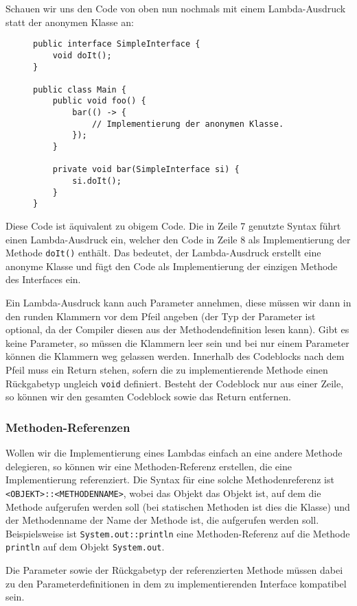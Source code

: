 	Schauen wir uns den Code von oben nun nochmals mit einem Lambda-Ausdruck statt der anonymen Klasse an:
	\begin{figure}[H]
		\centering
		\begin{lstlisting}
public interface SimpleInterface {
	void doIt();
}

public class Main {
	public void foo() {
		bar(() -> {
			// Implementierung der anonymen Klasse.
		});
	}

	private void bar(SimpleInterface si) {
		si.doIt();
	}
}
\end{lstlisting}
	\end{figure}
	Diese Code ist äquivalent zu obigem Code. Die in Zeile 7 genutzte Syntax führt einen Lambda-Ausdruck ein, welcher den Code in Zeile 8 als Implementierung der Methode \lstinline|doIt()| enthält. Das bedeutet, der Lambda-Ausdruck erstellt eine anonyme Klasse und fügt den Code als Implementierung der einzigen Methode des Interfaces ein.
	
	Ein Lambda-Ausdruck kann auch Parameter annehmen, diese müssen wir dann in den runden Klammern vor dem Pfeil angeben (der Typ der Parameter ist optional, da der Compiler diesen aus der Methodendefinition lesen kann). Gibt es keine Parameter, so müssen die Klammern leer sein und bei nur einem Parameter können die Klammern weg gelassen werden. Innerhalb des Codeblocks nach dem Pfeil muss ein Return stehen, sofern die zu implementierende Methode einen Rückgabetyp ungleich \lstinline|void| definiert. Besteht der Codeblock nur aus einer Zeile, so können wir den gesamten Codeblock sowie das Return entfernen.
	
	\subsubsection{Methoden-Referenzen}
		Wollen wir die Implementierung eines Lambdas einfach an eine andere Methode delegieren, so können wir eine Methoden-Referenz erstellen, die eine Implementierung referenziert. Die Syntax für eine solche Methodenreferenz ist \lstinline|<OBJEKT>::<METHODENNAME>|, wobei das Objekt das Objekt ist, auf dem die Methode aufgerufen werden soll (bei statischen Methoden ist dies die Klasse) und der Methodenname der Name der Methode ist, die aufgerufen werden soll. Beispielsweise ist \lstinline|System.out::println| eine Methoden-Referenz auf die Methode \lstinline|println| auf dem Objekt \lstinline|System.out|.
		
		Die Parameter sowie der Rückgabetyp der referenzierten Methode müssen dabei zu den Parameterdefinitionen in dem zu implementierenden Interface kompatibel sein.
	
